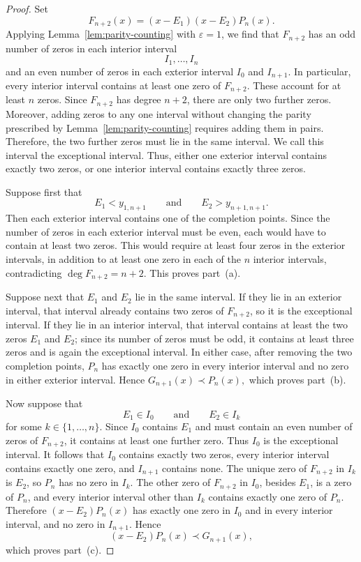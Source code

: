 \documentclass[10pt,a4paper]{amsart}
\begin{document}
\begin{proof}
Set
\[
F_{n+2}(x)=(x-E_1)(x-E_2)P_n(x).
\]
Applying Lemma~\ref{lem:parity-counting} with $\varepsilon=1$, we find that $F_{n+2}$
has an odd number of zeros in each interior interval
\[
I_1,\ldots,I_n
\]
and an even number of zeros in each exterior interval $I_0$ and
$I_{n+1}$. In particular, every interior interval contains at least one zero of
$F_{n+2}$. These account for at least $n$ zeros. Since
$F_{n+2}$ has degree $n+2$, there are only two further zeros.
Moreover, adding zeros to any one interval without changing the parity
prescribed by Lemma~\ref{lem:parity-counting} requires adding them in pairs. Therefore, the
two further zeros must lie in the same interval. We call this interval
the exceptional interval. Thus, either one exterior interval contains
exactly two zeros, or one interior interval contains exactly three
zeros. 

\medskip \noindent Suppose first that
\[
E_1<y_{1,n+1}
\qquad\text{and}\qquad
E_2>y_{n+1,n+1}.
\]
Then each exterior interval contains one of the completion points.
Since the number of zeros in each exterior interval must be even, each
would have to contain at least two zeros. This would require at least
four zeros in the exterior intervals, in addition to at least one zero
in each of the $n$ interior intervals, contradicting
$\deg F_{n+2}=n+2$. This proves part~(a).

\medskip \noindent Suppose next that $E_1$ and $E_2$ lie in the same interval. If they
lie in an exterior interval, that interval already contains two zeros
of $F_{n+2}$, so it is the exceptional interval. If they lie in an
interior interval, that interval contains at least the two zeros
$E_1$ and $E_2$; since its number of zeros must be odd, it contains
at least three zeros and is again the exceptional interval. In
either case, after removing the two completion points, $P_n$ has
exactly one zero in every interior interval and no zero in either
exterior interval. Hence $G_{n+1}(x)\prec P_n(x),$ which proves part~(b).



\medskip \noindent Now suppose that
\[
E_1\in I_0
\qquad\text{and}\qquad
E_2\in I_k
\]
for some $k\in\{1,\ldots,n\}$. Since $I_0$ contains $E_1$ and
must contain an even number of zeros of $F_{n+2}$, it contains at
least one further zero. Thus $I_0$ is the exceptional interval.
It follows that $I_0$ contains exactly two zeros, every interior
interval contains exactly one zero, and $I_{n+1}$ contains none. The unique zero of $F_{n+2}$ in $I_k$ is $E_2$, so $P_n$ has no
zero in $I_k$. The other zero of $F_{n+2}$ in $I_0$, besides
$E_1$, is a zero of $P_n$, and every interior interval other than
$I_k$ contains exactly one zero of $P_n$. Therefore
$(x-E_2)P_n(x)$ has exactly one zero in $I_0$ and in every interior
interval, and no zero in $I_{n+1}$. Hence
\[
(x-E_2)P_n(x)\prec G_{n+1}(x),
\]
which proves part~(c).


\end{proof}
\end{document}
